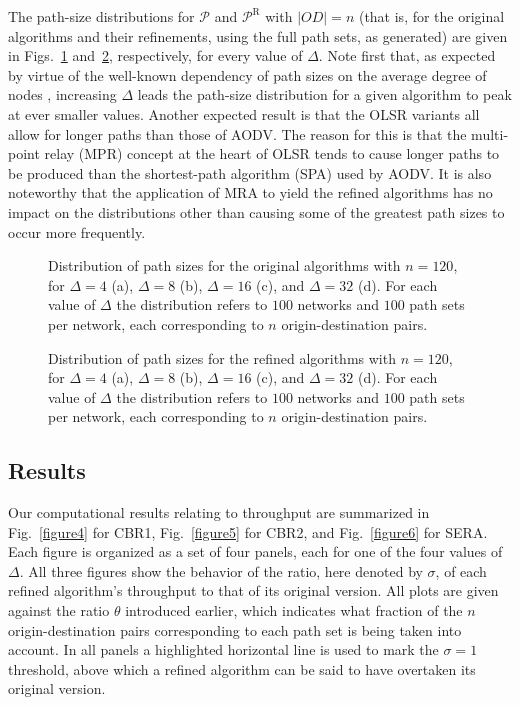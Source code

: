 \documentclass{article}
\begin{document}
The path-size distributions for $\mathcal{P}$ and $\mathcal{P}^\mathrm{R}$ with
$\vert OD\vert=n$ (that is, for the original algorithms and their refinements,
using the full path sets, as generated) are given in Figs.~\ref{figure2}
and~\ref{figure3}, respectively, for every value of $\Delta$. Note first that,
as expected by virtue of the well-known dependency of path sizes on the average
degree of nodes \cite{Dirac1952}, increasing $\Delta$ leads the path-size
distribution for a given algorithm to peak at ever smaller values. Another
expected result is that the OLSR variants all allow for longer paths than those
of AODV. The reason for this is that the multi-point relay (MPR) concept at the
heart of OLSR tends to cause longer paths to be produced than the shortest-path
algorithm (SPA) used by AODV. It is also noteworthy that the application of MRA
to yield the refined algorithms has no impact on the distributions other than
causing some of the greatest path sizes to occur more frequently.

\begin{figure}[p]
\centering
{}
\caption{Distribution of path sizes for the original algorithms with $n=120$,
for $\Delta=4$ (a), $\Delta=8$ (b), $\Delta=16$ (c), and $\Delta=32$ (d). For
each value of $\Delta$ the distribution refers to $100$ networks and $100$ path
sets per network, each corresponding to $n$ origin-destination pairs.}
\label{figure2}
\end{figure}

\begin{figure}[p]
\centering
{}
\caption{Distribution of path sizes for the refined algorithms with $n=120$, for
$\Delta=4$ (a), $\Delta=8$ (b), $\Delta=16$ (c), and $\Delta=32$ (d). For each
value of $\Delta$ the distribution refers to $100$ networks and $100$ path sets
per network, each corresponding to $n$ origin-destination pairs.}
\label{figure3}
\end{figure}

\subsection{Results}\label{subsec:theresults}

Our computational results relating to throughput are summarized in
Fig.~\ref{figure4} for CBR1, Fig.~\ref{figure5} for CBR2, and Fig.~\ref{figure6}
for SERA. Each figure is organized as a set of four panels, each for one of the
four values of $\Delta$. All three figures show the behavior of the ratio, here
denoted by $\sigma$, of each refined algorithm's throughput to that of its
original version. All plots are given against the ratio $\theta$ introduced
earlier, which indicates what fraction of the $n$ origin-destination pairs
corresponding to each path set is being taken into account. In all panels a
highlighted horizontal line is used to mark the $\sigma=1$ threshold, above
which a refined algorithm can be said to have overtaken its original version.
\end{document}
